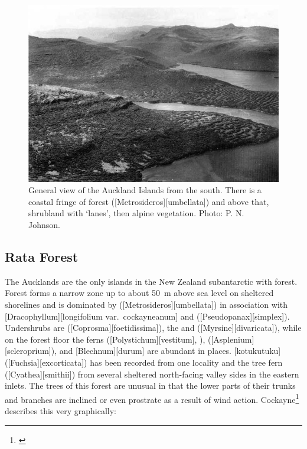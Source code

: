 \begin{figure}[!b]
	\includegraphics[width=\textwidth]{graphics/figure116auckland-islands.jpg}
	\centering
	\caption[General view of the Auckland Islands from the south]{General view of the Auckland Islands from the south.
	There is a coastal fringe of  forest ([Metrosideros][umbellata]) and above that, shrubland with `lanes', then alpine vegetation.
	Photo: P. N. Johnson.}%
	\label{fig:116auckland-islands}
\end{figure}

\subsection{Rata Forest}

The Aucklands are the only islands in the New Zealand subantarctic with forest.
Forest forms a narrow zone up to about \SI{50}{\metre} above sea level on sheltered shorelines and is dominated by  ([Metrosideros][umbellata]) in association with [Dracophyllum][longifolium var.\ cockayneanum] and  ([Pseudopanax][simplex]).
Undershrubs are  ([Coprosma][foetidissima]), the  and  ([Myrsine][divaricata]), while on the forest floor the ferns  ([Polystichum][vestitum], ),  ([Asplenium][scleroprium]), and [Blechnum][durum] are abundant in places.
[kotukutuku] ([Fuchsia][excorticata]) has been recorded from one locality and the tree fern  ([Cyathea][smithii]) from several sheltered north-facing valley sides in the eastern inlets.
The trees of this forest are unusual in that the lower parts of their trunks and branches are inclined or even prostrate as a result of wind action.
Cockayne\footnote{\cite{cockayne1909ecological}} describes this very graphically:

